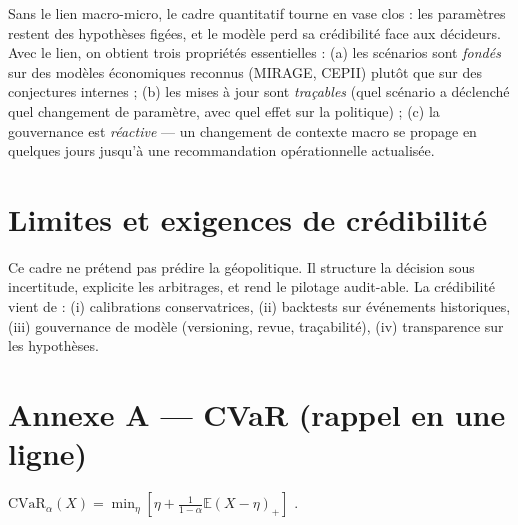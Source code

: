 \documentclass[11pt,a4paper]{article}
\begin{document}
Sans le lien macro-micro, le cadre quantitatif tourne en vase clos : les paramètres restent des hypothèses figées, et le modèle perd sa crédibilité face aux décideurs.
Avec le lien, on obtient trois propriétés essentielles :
(a) les scénarios sont \emph{fondés} sur des modèles économiques reconnus (MIRAGE, CEPII) plutôt que sur des conjectures internes ;
(b) les mises à jour sont \emph{traçables} (quel scénario a déclenché quel changement de paramètre, avec quel effet sur la politique) ;
(c) la gouvernance est \emph{réactive} — un changement de contexte macro se propage en quelques jours jusqu’à une recommandation opérationnelle actualisée.

\section{Limites et exigences de crédibilité}

Ce cadre ne prétend pas prédire la géopolitique. Il structure la décision sous incertitude, explicite les arbitrages, et rend le pilotage audit-able.
La crédibilité vient de : (i) calibrations conservatrices, (ii) backtests sur événements historiques, (iii) gouvernance de modèle (versioning, revue, traçabilité), (iv) transparence sur les hypothèses.

\appendix
\section{Annexe A — CVaR (rappel en une ligne)}
\(
\mathrm{CVaR}_\alpha(X)=\min_{\eta}\left[\eta+\frac{1}{1-\alpha}\mathbb{E}(X-\eta)_+\right]
\) \citep{rockafellarryasev2000}.




\end{document}
